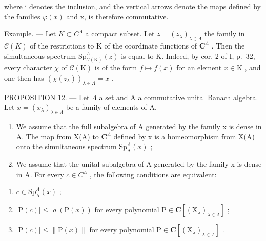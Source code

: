 where i denotes the inclusion, and the vertical arrows denote the maps defined by the families \(\varphi(x)\) and x, is therefore commutative.

Example. --- Let \(K \subset C^{\Lambda}\) a compact subset. Let \(z = (z_{\lambda})_{\lambda \in \Lambda}\) the family in \(\mathcal{C}(K)\) of the restrictions to K of the coordinate functions of \(\mathbf{C}^{\Lambda}\) . Then the simultaneous spectrum \(\mathrm{Sp}_{\mathcal{C}(\mathrm{K})}^{\Lambda}(z)\) is equal to K. Indeed, by cor. 2 of I, p.~32, every character \(\chi\) of \(\mathcal{C}(\mathrm{K})\) is of the form \(f \mapsto f(x)\) for an element \(x \in \mathrm{K}\) , and one then has \((\chi(z_{\lambda}))_{\lambda \in \Lambda} = x\) .

PROPOSITION 12. — Let \(\Lambda\) a set and A a commutative unital Banach algebra. Let \(x = (x_{\lambda})_{\lambda \in \Lambda}\) be a family of elements of A.

\begin{enumerate}
\def\labelenumi{\alph{enumi})}
\item
  We assume that the full subalgebra of A generated by the family x is dense in A. The map from X(A) to \(\mathbf{C}^{\Lambda}\) defined by x is a homeomorphism from X(A) onto the simultaneous spectrum \(\mathrm{Sp}_{\mathrm{A}}^{\Lambda}(x)\) ;
\item
  We assume that the unital subalgebra of A generated by the family x is dense in A. For every \(c \in C^{\Lambda}\) , the following conditions are equivalent:
\end{enumerate}

\begin{enumerate}
\def\labelenumi{(\roman{enumi})}
\item
  \(c \in \mathrm{Sp}_{\mathrm{A}}^{\Lambda}(x)\) ;
\item
  \(|\mathrm{P}(c)| \leqslant \varrho(\mathrm{P}(x))\) for every polynomial \(\mathrm{P} \in \mathbf{C}[(\mathrm{X}_{\lambda})_{\lambda \in \Lambda}]\) ;
\item
  \(|\mathrm{P}(c)| \leqslant \| \mathrm{P}(x)\|\) for every polynomial \(\mathrm{P} \in \mathbf{C}[(\mathrm{X}_{\lambda})_{\lambda \in \Lambda}]\) .
\end{enumerate}

